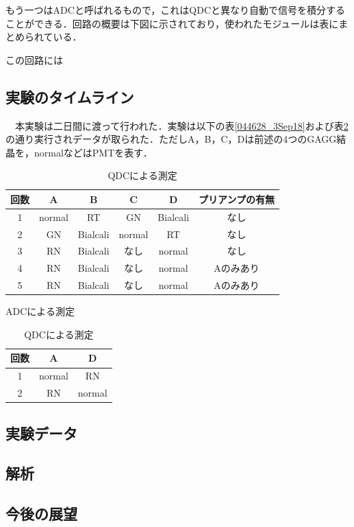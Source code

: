 \documentclass[a4j]{jarticle}
\begin{document}
もう一つはADCと呼ばれるもので，これはQDCと異なり自動で信号を積分することができる．回路の概要は下図に示されており，使われたモジュールは表にまとめられている．





この回路には


\subsection{実験のタイムライン}
　本実験は二日間に渡って行われた．実験は以下の表\ref{044628_3Sep18}および表\ref{045055_3Sep18}の通り実行されデータが取られた．ただしA，B，C，Dは前述の$4$つのGAGG結晶を，normalなどはPMTを表す．

\begin{table}[htb]
 \centering
 \begin{tabular}{|c|c|c|c|c|c|}\hline
  回数&A      &B        &C      &D        &プリアンプの有無 \\\hline
     1&normal &RT       &GN     &Bialcali &なし\\\hline
     2&GN     &Bialcali &normal &RT       &なし\\\hline
     3&RN     &Bialcali &なし   &normal   &なし\\\hline
     4&RN     &Bialcali &なし   &normal   &Aのみあり\\\hline
     5&RN     &Bialcali &なし   &normal   &Aのみあり\\\hline
 \end{tabular}
 \caption{ADCによる測定}
 \label{044628_3Sep18}

 \begin{tabular}{|c|c|c|}\hline
 回数&A      &D      \\\hline
 1&normal &RN     \\\hline
    2&RN     &normal \\\hline
\end{tabular}
 \caption{QDCによる測定}
 \label{045055_3Sep18}
\end{table}




\subsection{実験データ}


\subsection{解析}


\subsection{今後の展望}
\end{document}
